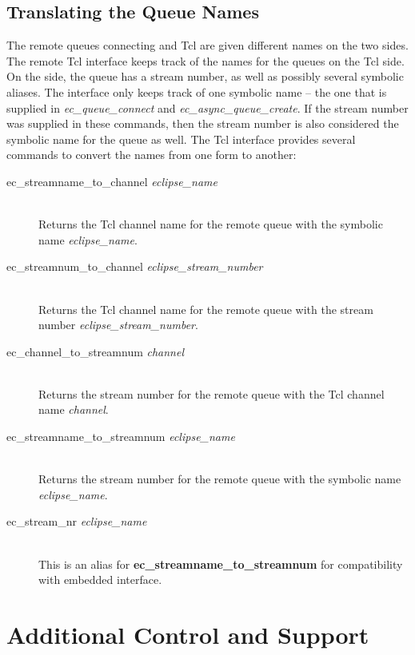 \subsection{Translating the Queue Names}
\label{translate-remote-qnames}

The remote queues connecting {\eclipse} and Tcl are given different names
on the two sides. The remote Tcl interface
keeps track of the {\eclipse} names for the queues on the Tcl side. On the
{\eclipse} side, the queue has a stream number, as well as possibly several
symbolic aliases. The interface only keeps track of one symbolic name --
the one that is supplied in {\it ec_queue_connect\/} and {\it
ec_async_queue_create}. If the {\eclipse} stream number was supplied in
these commands, then the stream number is also considered the symbolic name
for the queue as well. The Tcl interface provides several commands to convert the names
from one form to another:

\begin{description}
\item[ec_streamname_to_channel {\it eclipse_name}]\ \\
	Returns the Tcl channel name for the remote queue with the
	symbolic name {\it eclipse_name}. 
\item[ec_streamnum_to_channel {\it eclipse_stream_number}]\ \\
	Returns the Tcl channel name for the remote queue with the
	{\eclipse} stream number {\it eclipse_stream_number}.
\item[
	ec_channel_to_streamnum {\it channel}]\ \\
	Returns the {\eclipse} stream number for the remote queue with the
	Tcl channel name {\it channel}.
\item[ec_streamname_to_streamnum {\it eclipse_name}]\ \\
	Returns the {\eclipse} stream number for the remote queue with the
	symbolic name {\it eclipse_name}.
\item[ec_stream_nr {\it eclipse_name}]\ \\
	This is an alias for {\bf ec_streamname_to_streamnum} for
	compatibility with embedded interface.
\end{description}


\section{Additional Control and Support}
\label{remote-control}


